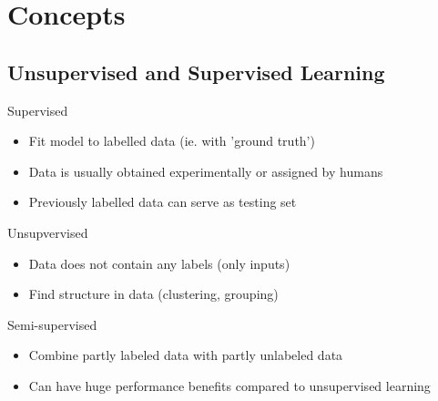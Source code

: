 \section{Concepts}
\label{sec:concepts}
\subsection{Unsupervised and Supervised Learning}
\label{subsec:concepts-un-supervised-learning}
\begin{frame}{\insertsubsection}
    Supervised
    \pause
    \begin{itemize}[<+->]
        \item Fit model to labelled data (ie. with 'ground truth')
        \item Data is usually obtained experimentally or assigned by humans
        \item Previously labelled data can serve as testing set
    \end{itemize}
    \pause
    Unsupvervised
    \pause
    \begin{itemize}[<+->]
        \item Data does not contain any labels (only inputs)
        \item Find structure in data (clustering, grouping)
    \end{itemize}
    \pause
    Semi-supervised
    \pause
    \begin{itemize}[<+->]
        \item Combine partly labeled data with partly unlabeled data
        \item Can have huge performance benefits compared to unsupervised learning
    \end{itemize}
\end{frame}
%
%
